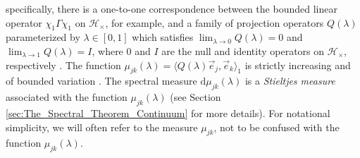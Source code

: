 \documentclass{cmslatex}
\renewcommand{\d}{\text{d}}
\begin{document}
specifically, there is a one-to-one correspondence between the bounded
linear operator $\chi_1\Gamma\chi_1$ on $\mathscr{H}_\times$, for example, and a
family of projection operators $Q(\lambda)$ parameterized by $\lambda\in[0,1]$ which
satisfies $\lim_{\lambda\to0}Q(\lambda)=0$ and $\lim_{\lambda\to1}Q(\lambda)=I$, where $0$ and $I$
are the null and identity operators on $\mathscr{H}_\times$, respectively
\cite{Stone:64}. The function $\mu_{jk}(\lambda)=\langle Q(\lambda)\vec{e}_j,\vec{e}_k\rangle_1$
is strictly increasing and of bounded variation \cite{Stone:64}.
The spectral measure $\d\mu_{jk}(\lambda)$ is a \emph{Stieltjes measure}
\cite{Folland:99} associated with the function $\mu_{jk}(\lambda)$
\cite{Stone:64} (see Section \ref{sec:The_Spectral_Theorem_Continuum}
for more details). For notational simplicity, we will often refer to
the measure $\mu_{jk}$, not to be confused with the function $\mu_{jk}(\lambda)$. 
\end{document}
